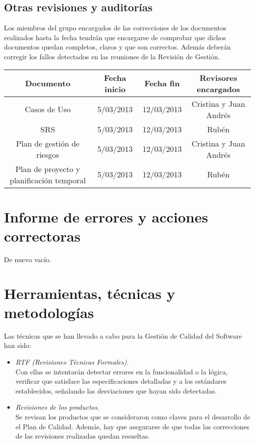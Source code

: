 \documentclass[11pt, a4paper, twoside, titlepage]{article}
\begin{document}
			
		\subsection{Otras revisiones y auditorías}
		Los miembros del grupo encargados de las correcciones de los documentos realizados hasta la fecha tendrán que encargarse 	de comprobar que dichos documentos quedan completos, claros y que son correctos. Además deberán corregir los fallos detectados en las reuniones de la Revisión de Gestión. \\
		
			\begin{center}
			\begin{tabular}{| c | c | c | c |}
				\hline
				\bfseries Documento 	& \bfseries Fecha inicio & \bfseries Fecha fin & \bfseries Revisores encargados	\\ \hline
				Casos de Uso		& 5/03/2013	& 12/03/2013	& Cristina y Juan Andrés	\\ \hline
				SRS 			& 5/03/2013 	& 12/03/2013 	& Rubén				\\ \hline
				Plan de gestión de riesgos & 5/03/2013	& 12/03/2013 	& Cristina y Juan Andrés	\\ \hline
				Plan de proyecto y planificación temporal & 5/03/2013 	& 12/03/2013 & Rubén		\\ \hline
			\end{tabular}
			\end{center}
		
	\section{Informe de errores y acciones correctoras} %
		De nuevo vacío.
	
	\section{Herramientas, técnicas y metodologías} %
		Las técnicas que se han llevado a cabo para la Gestión de Calidad del Software han sido:
        \begin{itemize}
          \item \textsl{RTF (Revisiones Técnicas Formales).} \\
          Con ellas se intentarán detectar errores en la funcionalidad o la lógica, verificar que satisface las especificaciones detalladas y a los estándares establecidos, señalando las desviaciones que hayan sido detectadas.
          \item \textsl{Revisiones de los productos.} \\
          Se revisan los productos que se consideraron como claves para el desarrollo de el Plan de Calidad. Además, hay que asegurarse de que todas las correcciones de las revisiones realizadas quedan resueltas.
         \end{itemize}
\end{document}
